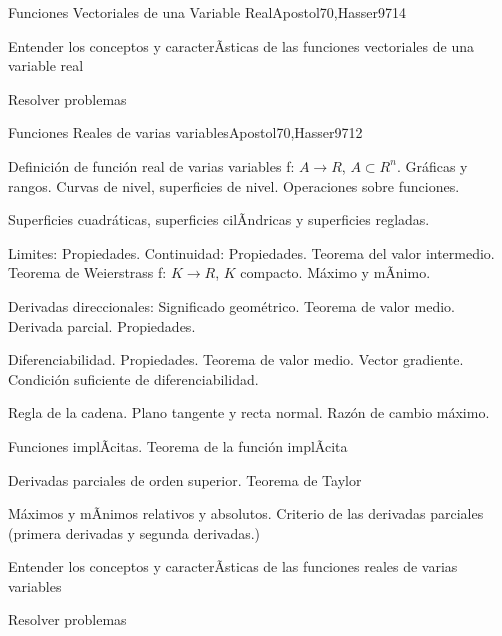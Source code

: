 \begin{syllabus}
\begin{unit}{Funciones Vectoriales de una Variable Real}{Apostol70,Hasser97}{14}
   \begin{unitgoals}
         \item  Entender los conceptos y caracterÃ­sticas de las funciones vectoriales de una variable real
         \item  Resolver problemas
   \end{unitgoals}
\end{unit}

\begin{unit}{Funciones Reales de varias variables}{Apostol70,Hasser97}{12}
   \begin{topics}
	\item  Definición de función real de varias variables f: $A \rightarrow R$, $A \subset R^n$. Gráficas y rangos. Curvas de nivel, superficies de nivel. Operaciones sobre funciones.
	\item  Superficies cuadráticas, superficies cilÃ­ndricas y superficies regladas.
	\item  Limites: Propiedades. Continuidad: Propiedades. Teorema del valor intermedio. Teorema de Weierstrass f: $K \rightarrow R$, $K$ compacto. Máximo y mÃ­nimo.
	\item  Derivadas direccionales: Significado geométrico. Teorema de valor medio. Derivada parcial. Propiedades.
	\item  Diferenciabilidad. Propiedades. Teorema de valor medio. Vector gradiente. Condición suficiente de diferenciabilidad.
	\item  Regla de la cadena. Plano tangente y recta normal. Razón de cambio máximo.
	\item Funciones implÃ­citas. Teorema de la función implÃ­cita
	\item Derivadas parciales de orden superior. Teorema de Taylor
	\item Máximos y mÃ­nimos relativos y absolutos. Criterio de las derivadas parciales (primera derivadas y segunda derivadas.)
   \end{topics}

   \begin{unitgoals}
         \item  Entender los conceptos y caracterÃ­sticas de las funciones reales de varias variables
         \item  Resolver problemas
   \end{unitgoals}
\end{unit}


\end{syllabus}
